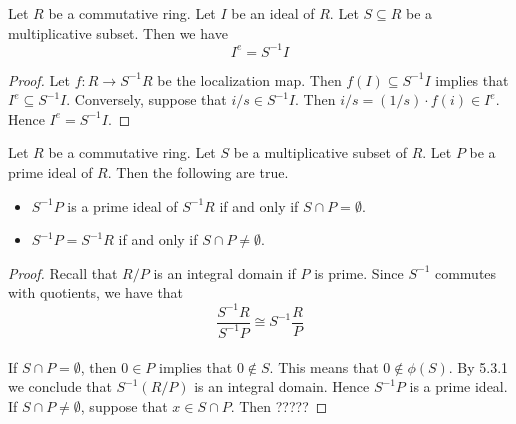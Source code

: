 \documentclass[a4paper]{article}
\begin{document}
\begin{lmm}{}{} Let $R$ be a commutative ring. Let $I$ be an ideal of $R$. Let $S\subseteq R$ be a multiplicative subset. Then we have $$I^e=S^{-1}I$$ 
\begin{proof}
Let $f:R\to S^{-1}R$ be the localization map. Then $f(I)\subseteq S^{-1}I$ implies that $I^e\subseteq S^{-1}I$. Conversely, suppose that $i/s\in S^{-1}I$. Then $i/s=(1/s)\cdot f(i)\in I^e$. Hence $I^e=S^{-1}I$. 
\end{proof}
\end{lmm}

\begin{prp}{}{} Let $R$ be a commutative ring. Let $S$ be a multiplicative subset of $R$. Let $P$ be a prime ideal of $R$. Then the following are true. 
\begin{itemize}
\item $S^{-1}P$ is a prime ideal of $S^{-1}R$ if and only if $S\cap P=\emptyset$. 
\item $S^{-1}P=S^{-1}R$ if and only if $S\cap P\neq\emptyset$. 
\end{itemize} 
\begin{proof}
Recall that $R/P$ is an integral domain if $P$ is prime. Since $S^{-1}$ commutes with quotients, we have that $$\frac{S^{-1}R}{S^{-1}P}\cong S^{-1}\frac{R}{P}$$~\\

If $S\cap P=\emptyset$, then $0\in P$ implies that $0\notin S$. This means that $0\notin\phi(S)$. By 5.3.1 we conclude that $S^{-1}(R/P)$ is an integral domain. Hence $S^{-1}P$ is a prime ideal. If $S\cap P\neq\emptyset$, suppose that $x\in S\cap P$. Then ?????
\end{proof}
\end{prp}
\end{document}
